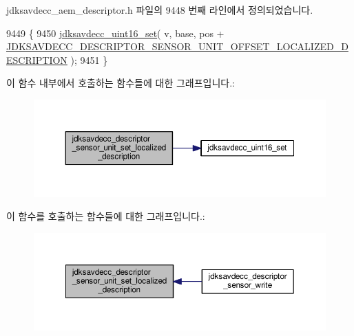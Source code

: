 jdksavdecc\+\_\+aem\+\_\+descriptor.\+h 파일의 9448 번째 라인에서 정의되었습니다.


\begin{DoxyCode}
9449 \{
9450     \hyperlink{group__endian_ga14b9eeadc05f94334096c127c955a60b}{jdksavdecc\_uint16\_set}( v, base, pos + 
      \hyperlink{group__descriptor__sensor_gaea9805eb2c996c37916c2e3ea96cfb3c}{JDKSAVDECC\_DESCRIPTOR\_SENSOR\_UNIT\_OFFSET\_LOCALIZED\_DESCRIPTION}
       );
9451 \}
\end{DoxyCode}


이 함수 내부에서 호출하는 함수들에 대한 그래프입니다.\+:
\nopagebreak
\begin{figure}[H]
\begin{center}
\leavevmode
\includegraphics[width=350pt]{group__descriptor__sensor_gab44a73c297001a3a71b13b868ab97b40_cgraph}
\end{center}
\end{figure}




이 함수를 호출하는 함수들에 대한 그래프입니다.\+:
\nopagebreak
\begin{figure}[H]
\begin{center}
\leavevmode
\includegraphics[width=350pt]{group__descriptor__sensor_gab44a73c297001a3a71b13b868ab97b40_icgraph}
\end{center}
\end{figure}


